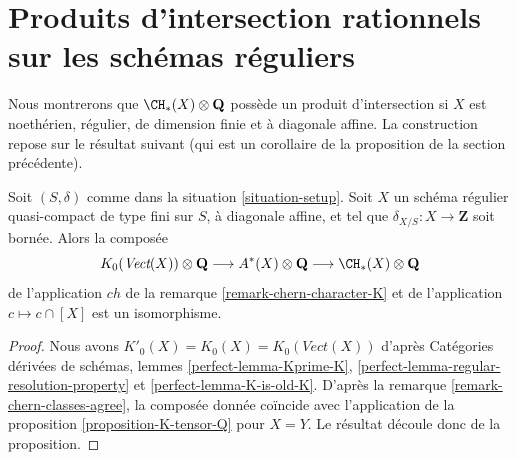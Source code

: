 \section{Produits d'intersection rationnels sur les schémas réguliers}
\label{section-intersection-regular}

\noindent
Nous montrerons que $\CH_*(X) \otimes \mathbf{Q}$ possède un produit
d'intersection si $X$ est noethérien, régulier, de dimension finie et à
diagonale affine. La construction repose sur le résultat suivant
(qui est un corollaire de la proposition de la section précédente).

\begin{lemma}
\label{lemma-K-tensor-Q}
Soit $(S, \delta)$ comme dans la situation \ref{situation-setup}.
Soit $X$ un schéma régulier quasi-compact de type fini sur $S$, à
diagonale affine, et tel que $\delta_{X/S} : X \to \mathbf{Z}$ soit bornée.
Alors la composée
$$
K_0(\textit{Vect}(X)) \otimes \mathbf{Q}
\longrightarrow
A^*(X) \otimes \mathbf{Q}
\longrightarrow
\CH_*(X) \otimes \mathbf{Q}
$$
de l'application $ch$ de la remarque \ref{remark-chern-character-K} et
de l'application $c \mapsto c \cap [X]$ est un isomorphisme.
\end{lemma}

\begin{proof}
Nous avons $K'_0(X) = K_0(X) = K_0(\textit{Vect}(X))$ d'après
Catégories dérivées de schémas, lemmes \ref{perfect-lemma-Kprime-K},
\ref{perfect-lemma-regular-resolution-property} et
\ref{perfect-lemma-K-is-old-K}.
D'après la remarque \ref{remark-chern-classes-agree},
la composée donnée coïncide avec l'application de la
proposition \ref{proposition-K-tensor-Q} pour $X = Y$.
Le résultat découle donc de la proposition.
\end{proof}

